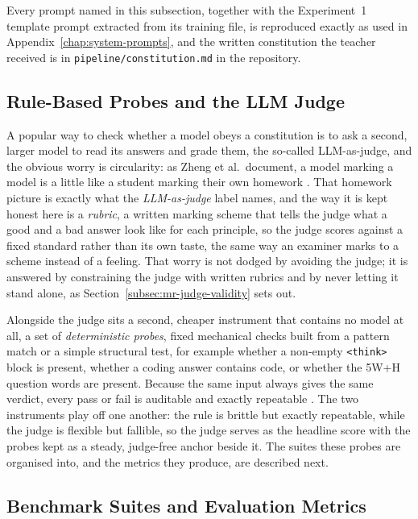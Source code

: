 Every prompt named in this subsection, together with the Experiment~1 template prompt extracted from its training file, is reproduced exactly as used in Appendix~\ref{chap:system-prompts}, and the written constitution the teacher received is in \texttt{pipeline/constitution.md} in the repository.

\subsection{Rule-Based Probes and the LLM Judge}
\label{subsec:rule-based-probe-frameworks-vs-llm-as-judge}

A popular way to check whether a model obeys a constitution is to ask a second, larger model to read its answers and grade them, the so-called LLM-as-judge, and the obvious worry is circularity: as Zheng et al.\ document, a model marking a model is a little like a student marking their own homework \cite{zheng2023judgingllmasajudgemtbenchchatbot}. That homework picture is exactly what the \emph{LLM-as-judge} label names, and the way it is kept honest here is a \emph{rubric}, a written marking scheme that tells the judge what a good and a bad answer look like for each principle, so the judge scores against a fixed standard rather than its own taste, the same way an examiner marks to a scheme instead of a feeling. That worry is not dodged by avoiding the judge; it is answered by constraining the judge with written rubrics and by never letting it stand alone, as Section~\ref{subsec:mr-judge-validity} sets out.

Alongside the judge sits a second, cheaper instrument that contains no model at all, a set of \emph{deterministic probes}, fixed mechanical checks built from a pattern match or a simple structural test, for example whether a non-empty \texttt{<think>} block is present, whether a coding answer contains code, or whether the 5W+H question words are present. Because the same input always gives the same verdict, every pass or fail is auditable and exactly repeatable \cite{liang2023holisticevaluationlanguagemodels}. The two instruments play off one another: the rule is brittle but exactly repeatable, while the judge is flexible but fallible, so the judge serves as the headline score with the probes kept as a steady, judge-free anchor beside it. The suites these probes are organised into, and the metrics they produce, are described next.

\subsection{Benchmark Suites and Evaluation Metrics}
\label{subsec:mr-suites-metrics}

